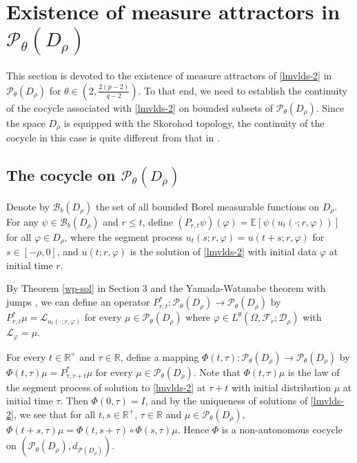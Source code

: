 \documentclass[11pt]{article}
\numberwithin{equation}{section}
\theoremstyle{plain}
\begin{document}
\section{Existence of  measure attractors
 in  $\mathcal{P}_{\theta}(D_{\rho})$} \label{4}
 This section is devoted to the existence 
 of measure attractors
of  \eqref{lmvlds-2} in 
$\mathcal{P}_{\theta}(D_{\rho})$   
 for $ \theta \in \left(2, \tfrac{2(p-2)}{q-2} \right) $. 
 To that  end,
 we need to
 establish  the continuity of 
 the  cocycle associated with \eqref{lmvlds-2} 
 on bounded subsets 
 of  $\mathcal{P}_{\theta}(D_{\rho})$. 
 Since the space $D_{\rho}$
 is equipped with the 
 Skorohod topology,
the continuity of the cocycle in this case
is  quite  different from
that in
 \cite{SSW2026JDE, SSL2024arXiv, BCS2026JDE} .
 
 

\subsection{The cocycle on $ \mathcal{P}_{\theta}(D_{\rho})$}

 Denote by $\mathcal{B}_b(D_{\rho})$ the set of all bounded Borel measurable functions on $D_{\rho}$.
 For any $ \psi \in \mathcal{B}_b(D_{\rho}) $ and $ r \le t $, define
   $(P_{r,t} \psi)(\varphi)
     = \mathbb{E} \left[ \psi(u_t(\cdot;r,\varphi) ) \right]
   $
 for all $\varphi \in D_{\rho}$,
 where the segment process $u_t(s; r,\varphi) = u(t+s; r,\varphi)$ for $s \in [-\rho, 0]$,
 and $u(t; r,\varphi)$ is the solution of \eqref{lmvlds-2} with initial data $\varphi$ at initial time $r$.

 By Theorem \ref{wp-sol} in Section 3 
 and the Yamada-Watanabe theorem with jumps \cite{BLP2015IJSA, FHK2025arXiv}, 
 we can define 
 an  operator 
     $P^{*}_{r,t}:  \mathcal{P}_{\theta}(D_{\rho}) \to \mathcal{P}_{\theta}(D_{\rho})$ 
 by $P^{*}_{r,t} \mu = \mathcal{L}_{u_{t}(\cdot; r, \varphi)}$
 for every $\mu \in  \mathcal{P}_{\theta}(D_{\rho})$
 where  
  $\varphi \in L^{\theta}(\Omega, \mathcal{F}_r; \mathcal{D}_{\rho})$
with
  $  \mathcal{L}_{\varphi}=\mu$.

 For every $t \in \mathbb{R}^+$ and $\tau \in \mathbb{R}$,
 define 
 a
  mapping $\Phi(t,\tau): \mathcal{P}_{\theta}(D_{\rho}) \to \mathcal{P}_{\theta}(D_{\rho})$ by
   $\Phi(t,\tau) \mu = P^{*}_{\tau, \tau + t} \mu$
 for every $\mu \in \mathcal{P}_{\theta}(D_{\rho})$.
 Note that
 $\Phi(t,\tau) \mu$ is the law of the segment process of solution to \eqref{lmvlds-2} at $ \tau + t $ with
 initial distribution $\mu$ at  initial time $\tau$.
 Then $\Phi(0,\tau) = I$, and by the uniqueness of solutions of \eqref{lmvlds-2},
 we  see  that for all $t,s \in \mathbb{R}^{+}$, $\tau \in \mathbb{R}$ and $\mu \in \mathcal{P}_{\theta}(D_{\rho})$,
   $\Phi(t + s,\tau) \mu = \Phi(t, s+\tau) \circ \Phi(s,\tau)\mu$.
 Hence $\Phi$ is a non-autonomous cocycle on $\left( \mathcal{P}_{\theta}(D_{\rho}), d_{\mathcal{P}(D_{\rho})} \right)$.
\end{document}
